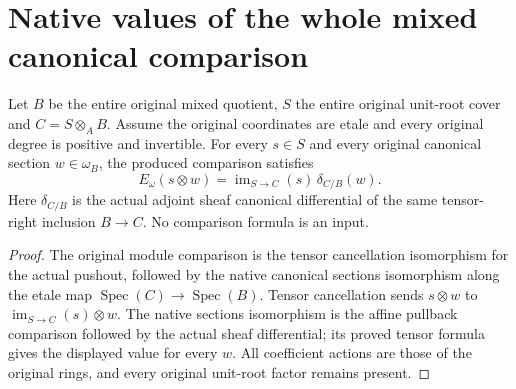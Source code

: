 \section{Native values of the whole mixed canonical comparison}

\begin{lemma}
\label{lem:kn-nadel-mixed-comparison-native-tensor}
\leanok
{}
Let $B$ be the entire original mixed quotient, $S$ the entire original
unit-root cover and $C=S\otimes_A B$. Assume the original coordinates
are etale and every original degree is positive and invertible.
For every $s\in S$ and every original canonical section $w\in\omega_B$,
the produced comparison satisfies
\[
 E_{\omega}(s\otimes w)=\operatorname{im}_{S\to C}(s)\,
   \delta_{C/B}(w).
\]
Here $\delta_{C/B}$ is the actual adjoint sheaf canonical differential
of the same tensor-right inclusion $B\to C$. No comparison formula is
an input.
\end{lemma}
\begin{proof}
The original module comparison is the tensor cancellation isomorphism
for the actual pushout, followed by the native canonical sections
isomorphism along the etale map $\operatorname{Spec}(C)\to
\operatorname{Spec}(B)$. Tensor cancellation sends $s\otimes w$ to
$\operatorname{im}_{S\to C}(s)\otimes w$. The native sections
isomorphism is the affine pullback comparison followed by the actual
sheaf differential; its proved tensor formula gives the displayed
value for every $w$. All coefficient actions are those of the original
rings, and every original unit-root factor remains present.
\end{proof}
